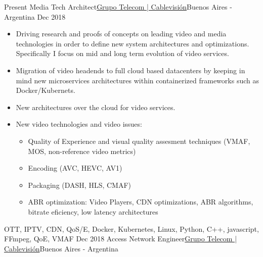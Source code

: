 %
%
%

\begin{experiences}
  \experience
    {Present}   {Media Tech Architect}{\href{https://www.cablevisionfibertel.com.ar/}{\color{accentcolor}Grupo Telecom | Cablevisión}}{Buenos Aires - Argentina}
    {Dec 2018} {
                      \begin{itemize}
                      \item Driving research and proofs of concepts on leading video and media technologies in order to define new system architectures and optimizations. Specifically I focus on mid and long term evolution of video services.
                      \item Migration of video headends to full cloud based datacenters by keeping in mind new microservices architectures within containerized frameworks such as Docker/Kubernets.
                      \item New architectures over the cloud for video services.
                      \item New video technologies and video issues:
                        \begin{itemize}
                        \item Quality of Experience and visual quality assesment techniques (VMAF, MOS, non-reference video metrics)
                        \item Encoding (AVC, HEVC, AV1)
                        \item Packaging (DASH, HLS, CMAF) 
                        \item ABR optimization: Video Players, CDN optimizations, ABR algorithms, bitrate eficiency, low latency architectures
                        \end{itemize}
                      \end{itemize}
                    }
                    {OTT, IPTV, CDN, QoS/E, Docker, Kubernetes, Linux, Python, C++, javascript, FFmpeg, QoE, VMAF}
  \emptySeparator
  \experience
    {Dec 2018} {Access Network  Engineer}{\href{https://www.cablevisionfibertel.com.ar/}{\color{accentcolor}Grupo Telecom | Cablevisión}}{Buenos Aires - Argentina}

\end{experiences}
